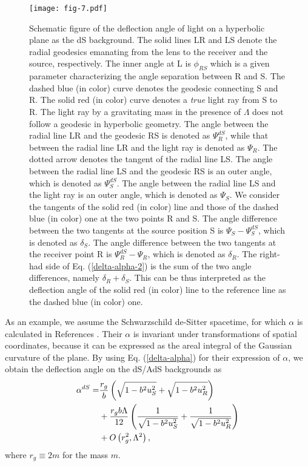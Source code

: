 \documentclass[twocolumn,showpacs,preprintnumbers,amsmath,amssymb]{revtex4-1}
\begin{document}
\begin{figure}
\texttt{[image: fig-7.pdf]}
\caption{
Schematic figure of the deflection angle of light on a hyperbolic plane 
as the dS background. 
The solid lines LR and LS denote the radial geodesics 
emanating from the lens to the receiver and the source, respectively. 
The inner angle at L is $\phi_{RS}$ which is a given parameter 
characterizing the angle separation between R and S. 
The dashed blue (in color) curve denotes 
the geodesic connecting S and R.  
The solid red (in color) curve denotes 
a {\it true} light ray from S to R. 
The light ray by a gravitating mass in the presence of $\Lambda$ 
does not follow a geodesic in hyperbolic geometry. 
The angle between the radial line LR and the geodesic RS is denoted as 
$\Psi_R^{dS}$, 
while that between the radial line LR and the light ray 
is denoted as $\Psi_R$. 
The dotted arrow denotes 
the tangent of the radial line LS. 
The angle between the radial line LS and the geodesic RS 
is an outer angle, which is denoted as $\Psi_S^{dS}$. 
The angle between the radial line LS and the light ray 
is an outer angle, which is denoted as $\Psi_S$. 
We consider the tangents of the solid red (in color) line 
and those of the dashed blue (in color) one 
at the two points R and S. 
The angle difference between the two tangents 
at the source position S is 
$\Psi_S - \Psi_S^{dS}$, 
which is denoted as $\delta_S$.  
The angle difference between the two tangents 
at the receiver point R is 
$\Psi_R^{dS} - \Psi_R$, 
which is denoted as $\delta_R$. 
The right-had side of Eq. (\ref{delta-alpha-2}) 
is the sum of the two angle differences, namely 
$\delta_R + \delta_S$. 
This can be thus interpreted as the deflection angle of the solid red (in color) line 
to the reference line as the dashed blue (in color) one. 
}
\label{fig-deflection-h}
\end{figure}



As an example, 
we assume the Schwarzschild de-Sitter spacetime, 
for which $\alpha$ is calculated in References 
\cite{Ishihara2016, Takizawa2020a}. 
Their $\alpha$ is invariant 
under transformations of spatial coordinates, 
because it can be expressed as the areal integral of the Gaussian 
curvature of the plane. 
By using Eq. (\ref{delta-alpha}) for their expression of $\alpha$, 
we obtain the deflection angle 
on the dS/AdS backgrounds as
\begin{align}
\alpha^{dS}
=&
  \frac{r_g}{b}\left(\sqrt{1 - b^2 u^2_S} + \sqrt{1 - b^2 u^2_R}\right)
\notag\\
& + \frac{r_g b\Lambda}{12}\left(\frac{1}{\sqrt{1 - b^2 u^2_S}}
  + \frac{1}{\sqrt{1 - b^2 u^2_R}}\right)
\notag\\
&  + O\left(r^2_g, \Lambda^2\right) , 
\label{delta-alpha-dS}
\end{align}
where $r_g \equiv 2m$ for the mass $m$. 
\end{document}
